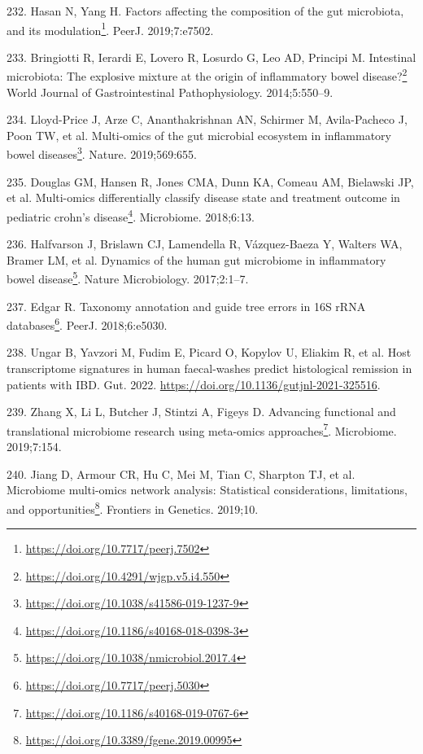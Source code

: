 \documentclass[
  12pt,
  a4paper,
  twoside,
  openright]{book}
\DeclareRobustCommand{\href}[2]{#2\footnote{\url{#1}}}
\newlength{\cslhangindent}
\newlength{\cslentryspacingunit} %
\newenvironment{CSLReferences}[2] %
 {%
  \setlength{\parindent}{0pt}
  \ifodd #1
  \let\oldpar\par
  \def\par{\hangindent=\cslhangindent\oldpar}
  \fi
  \setlength{\parskip}{#2\cslentryspacingunit}
 }%
 {}
\begin{document}
\begin{CSLReferences}{0}{0}
\leavevmode{}%
232. Hasan N, Yang H. \href{https://doi.org/10.7717/peerj.7502}{Factors affecting the composition of the gut microbiota, and its modulation}. PeerJ. 2019;7:e7502.

\leavevmode{}%
233. Bringiotti R, Ierardi E, Lovero R, Losurdo G, Leo AD, Principi M. \href{https://doi.org/10.4291/wjgp.v5.i4.550}{Intestinal microbiota: The explosive mixture at the origin of inflammatory bowel disease?} World Journal of Gastrointestinal Pathophysiology. 2014;5:550--9.

\leavevmode{}%
234. Lloyd-Price J, Arze C, Ananthakrishnan AN, Schirmer M, Avila-Pacheco J, Poon TW, et al. \href{https://doi.org/10.1038/s41586-019-1237-9}{Multi-omics of the gut microbial ecosystem in inflammatory bowel diseases}. Nature. 2019;569:655.

\leavevmode{}%
235. Douglas GM, Hansen R, Jones CMA, Dunn KA, Comeau AM, Bielawski JP, et al. \href{https://doi.org/10.1186/s40168-018-0398-3}{Multi-omics differentially classify disease state and treatment outcome in pediatric crohn{'}s disease}. Microbiome. 2018;6:13.

\leavevmode{}%
236. Halfvarson J, Brislawn CJ, Lamendella R, Vázquez-Baeza Y, Walters WA, Bramer LM, et al. \href{https://doi.org/10.1038/nmicrobiol.2017.4}{Dynamics of the human gut microbiome in inflammatory bowel disease}. Nature Microbiology. 2017;2:1--7.

\leavevmode{}%
237. Edgar R. \href{https://doi.org/10.7717/peerj.5030}{Taxonomy annotation and guide tree errors in 16S rRNA databases}. PeerJ. 2018;6:e5030.

\leavevmode{}%
238. Ungar B, Yavzori M, Fudim E, Picard O, Kopylov U, Eliakim R, et al. Host transcriptome signatures in human faecal-washes predict histological remission in patients with IBD. Gut. 2022. \url{https://doi.org/10.1136/gutjnl-2021-325516}.

\leavevmode{}%
239. Zhang X, Li L, Butcher J, Stintzi A, Figeys D. \href{https://doi.org/10.1186/s40168-019-0767-6}{Advancing functional and translational microbiome research using meta-omics approaches}. Microbiome. 2019;7:154.

\leavevmode{}%
240. Jiang D, Armour CR, Hu C, Mei M, Tian C, Sharpton TJ, et al. \href{https://doi.org/10.3389/fgene.2019.00995}{Microbiome multi-omics network analysis: Statistical considerations, limitations, and opportunities}. Frontiers in Genetics. 2019;10.


\end{CSLReferences}
\end{document}
